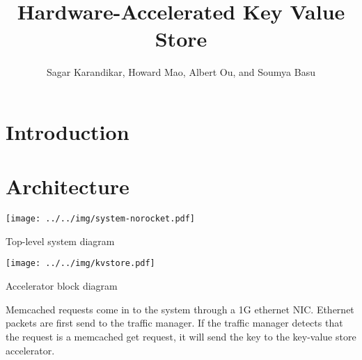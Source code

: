 \documentclass{article}
\title{Hardware-Accelerated Key Value Store}
\author{Sagar Karandikar, Howard Mao, Albert Ou, and Soumya Basu}
\begin{document}
\maketitle

\section{Introduction}

\section{Architecture}

\begin{minipage}{0.3\linewidth}
    \centering
    \texttt{[image: ../../img/system-norocket.pdf]}

    Top-level system diagram
\end{minipage}\qquad
\begin{minipage}{0.6\linewidth}
    \centering
    \texttt{[image: ../../img/kvstore.pdf]}

    Accelerator block diagram
\end{minipage}

\vspace{2ex}

Memcached requests come in to the system through a 1G ethernet NIC.
Ethernet packets are first send to the traffic manager. If the traffic manager
detects that the request is a memcached get request, it will send the key to
the key-value store accelerator.


\end{document}
